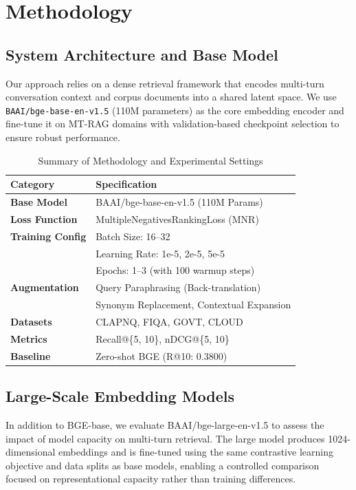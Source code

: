 \documentclass[11pt]{article}
\begin{document}
\section{Methodology}

\subsection{System Architecture and Base Model}
Our approach relies on a dense retrieval framework that encodes multi-turn conversation context and corpus documents into a shared latent space. We use \texttt{BAAI/bge-base-en-v1.5} (110M parameters) as the core embedding encoder and fine-tune it on MT-RAG domains with validation-based checkpoint selection to ensure robust performance.


\begin{table}[htbp]
\centering
\caption{Summary of Methodology and Experimental Settings}
\label{tab:methodology_summary}
\footnotesize
\setlength{\tabcolsep}{4pt}
\renewcommand{\arraystretch}{1.2}
\begin{tabular}{ll}
\toprule
\textbf{Category} & \textbf{Specification} \\
\midrule
\textbf{Base Model} & BAAI/bge-base-en-v1.5 (110M Params) \\
\textbf{Loss Function} & MultipleNegativesRankingLoss (MNR) \\
\midrule
\textbf{Training Config} & Batch Size: 16--32 \\
& Learning Rate: 1e-5, 2e-5, 5e-5 \\
& Epochs: 1--3 (with 100 warmup steps) \\
\midrule
\textbf{Augmentation} & Query Paraphrasing (Back-translation) \\
& Synonym Replacement, Contextual Expansion \\
\midrule
\textbf{Datasets} & CLAPNQ, FIQA, GOVT, CLOUD \\
\textbf{Metrics} & Recall@\{5, 10\}, nDCG@\{5, 10\} \\
\textbf{Baseline} & Zero-shot BGE (R@10: 0.3800) \\
\bottomrule
\end{tabular}
\end{table}

\subsection{Large-Scale Embedding Models}
In addition to BGE-base, we evaluate BAAI/bge-large-en-v1.5 to assess the impact of model capacity on multi-turn retrieval. The large model produces 1024-dimensional embeddings and is fine-tuned using the same contrastive learning objective and data splits as base models, enabling a controlled comparison focused on representational capacity rather than training differences.
\end{document}

